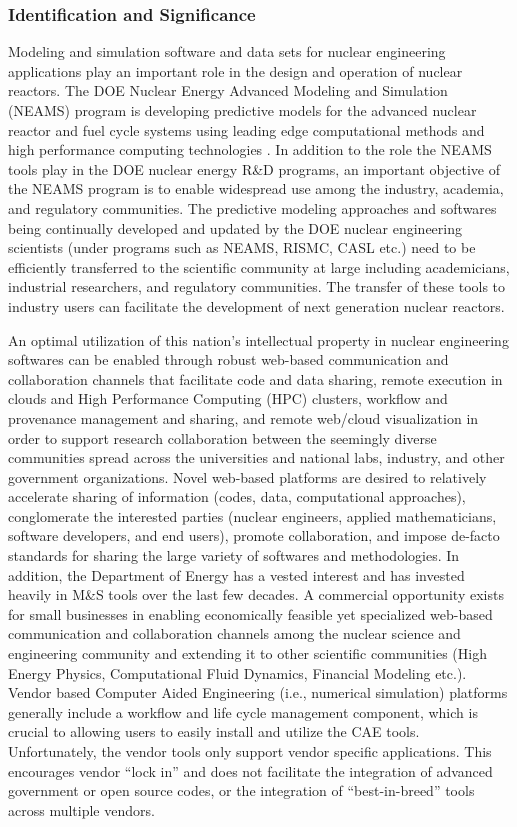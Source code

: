 \subsubsection{Identification and Significance}
\label{intro}
Modeling and simulation software and data sets for nuclear
engineering applications play an important role in the design and
operation of nuclear reactors. The DOE Nuclear Energy Advanced
Modeling and Simulation (NEAMS) program is developing predictive
models for the advanced nuclear reactor and fuel cycle systems using
leading edge computational methods and high performance computing
technologies \cite{NEAMS}. In addition to the role the NEAMS tools
play in the DOE nuclear energy R\&D programs, an important objective
of the NEAMS program is to enable widespread use among the industry,
academia, and regulatory communities\cite{NEAMS}. The predictive
modeling approaches and softwares being continually developed and
updated by the DOE nuclear engineering scientists (under programs such
as NEAMS, RISMC, CASL etc.) need to be efficiently transferred to the
scientific community at large including academicians, industrial
researchers, and regulatory communities. The transfer of these tools
to industry users can facilitate the development of next generation
nuclear reactors.

An optimal utilization of this nation's intellectual property in
nuclear engineering softwares can be enabled through robust web-based
communication and collaboration channels that facilitate code and data
sharing, remote execution in clouds and High Performance Computing
(HPC) clusters, workflow and provenance management and sharing, and
remote web/cloud visualization in order to support research
collaboration between the seemingly diverse communities spread across
the universities and national labs, industry, and other government
organizations. Novel web-based platforms are desired to relatively
accelerate sharing of information (codes, data, computational
approaches), conglomerate the interested parties (nuclear engineers,
applied mathematicians, software developers, and end users), promote
collaboration, and impose de-facto standards for sharing the large
variety of softwares and methodologies. In addition, the Department of
Energy has a vested interest and has invested heavily in M\&S tools
over the last few decades. A commercial opportunity exists for small
businesses in enabling economically feasible yet specialized web-based
communication and collaboration channels among the nuclear science and
engineering community and extending it to other scientific communities
(High Energy Physics, Computational Fluid Dynamics, Financial Modeling
etc.). Vendor based Computer Aided Engineering (i.e., numerical
simulation) platforms generally include a workflow and life cycle
management component, which is crucial to allowing users to easily
install and utilize the CAE tools. Unfortunately, the vendor tools only
support vendor specific applications. This encourages vendor ``lock
in'' and does not facilitate the integration of advanced government
or open source codes, or the integration of ``best-in-breed'' tools
across multiple vendors.

